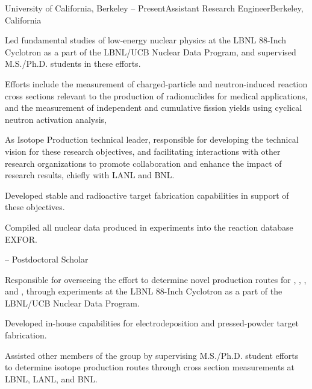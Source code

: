 \begin{rSubsection}{University of California, Berkeley}{ -- Present}{Assistant Research Engineer}{Berkeley, California}
\item Led fundamental studies of low-energy nuclear physics at the LBNL 88-Inch Cyclotron as a part of the LBNL/UCB Nuclear Data Program,  and supervised M.S./Ph.D. students in these efforts.
\item Efforts include the measurement of charged-particle and neutron-induced reaction cross sections relevant to the production of radionuclides for medical applications, and the measurement of independent and cumulative fission yields using cyclical neutron activation analysis,
\item As  Isotope Production technical leader, responsible for developing the technical vision for these research objectives, 
and facilitating interactions with other research organizations  to promote collaboration and enhance the impact of research results, chiefly with LANL and BNL. 
\item Developed stable and radioactive target fabrication capabilities in support of these objectives.
\item Compiled all nuclear data produced in  experiments into the reaction database EXFOR. 
\end{rSubsection}\vspace{-1.5\baselineskip}
\begin{rSubsection}{}{ -- }{Postdoctoral Scholar}{}
\item Responsible for overseeing the effort to determine novel production routes for , , , and , through experiments at the LBNL 88-Inch Cyclotron as a part of the LBNL/UCB Nuclear Data Program.
\item Developed in-house capabilities for electrodeposition and  pressed-powder target fabrication.
\item Assisted other members of the group by supervising M.S./Ph.D. student efforts to determine isotope production routes through cross section measurements at LBNL, LANL, and BNL.
\end{rSubsection}\vspace{-1.5\baselineskip}
